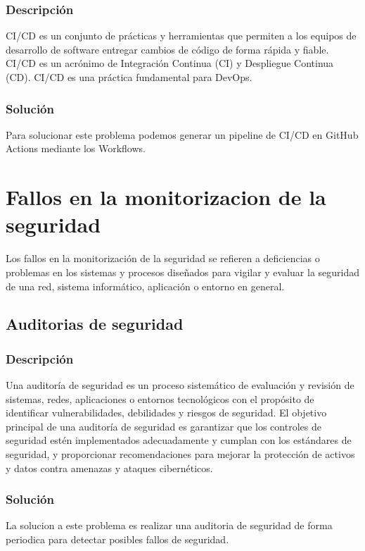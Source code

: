 \documentclass{report}
\begin{document}
                \subsubsection{Descripción}
                    CI/CD es un conjunto de prácticas y herramientas que permiten a los equipos de desarrollo de software entregar cambios de código de forma rápida y fiable. CI/CD es un acrónimo de Integración Continua (CI) y Despliegue Continua (CD). CI/CD es una práctica fundamental para DevOps.
                \subsubsection{Solución}
                    Para solucionar este problema podemos generar un pipeline de CI/CD en GitHub Actions mediante los Workflows.
            \clearpage
        \section{Fallos en la monitorizacion de la seguridad}
            Los fallos en la monitorización de la seguridad se refieren a deficiencias o problemas en los sistemas y procesos diseñados para vigilar y evaluar la seguridad de una red, sistema informático, aplicación o entorno en general.
            \subsection{Auditorias de seguridad}
                \subsubsection{Descripción}
                    Una auditoría de seguridad es un proceso sistemático de evaluación y revisión de sistemas, redes, aplicaciones o entornos tecnológicos con el propósito de identificar vulnerabilidades, debilidades y riesgos de seguridad. El objetivo principal de una auditoría de seguridad es garantizar que los controles de seguridad estén implementados adecuadamente y cumplan con los estándares de seguridad, y proporcionar recomendaciones para mejorar la protección de activos y datos contra amenazas y ataques cibernéticos.
                \subsubsection{Solución}
                    La solucion a este problema es realizar una auditoria de seguridad de forma periodica para detectar posibles fallos de seguridad. 
            \clearpage
\end{document}
